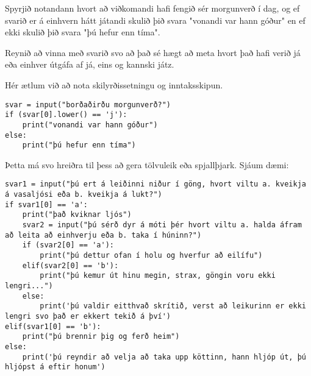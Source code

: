 \begin{exercise}\label{exp5}
Spyrjið notandann hvort að viðkomandi hafi fengið sér morgunverð í dag, og ef svarið er á einhvern hátt játandi skulið þið svara "vonandi var hann góður" en ef ekki skulið þið svara "þú hefur enn tíma".

Reynið að vinna með svarið svo að það sé hægt að meta hvort það hafi verið já eða einhver útgáfa af já, eins og kannski játz.
\end{exercise}
\begin{Answer}[ref={exp5}]
Hér ætlum við að nota skilyrðissetningu og inntaksskipun.
	\begin{lstlisting}
svar = input("borðaðirðu morgunverð?")
if (svar[0].lower() == 'j'):
	print("vonandi var hann góður")
else:
	print("þú hefur enn tíma")\end{lstlisting}

Þetta má svo hreiðra til þess að gera tölvuleik eða spjallþjark.
Sjáum dæmi:
\begin{lstlisting}
svar1 = input("þú ert á leiðinni niður í göng, hvort viltu a. kveikja á vasaljósi eða b. kveikja á lukt?")
if svar1[0] == 'a':
	print("það kviknar ljós")
	svar2 = input("þú sérð dyr á móti þér hvort viltu a. halda áfram að leita að einhverju eða b. taka í húninn?")
	if (svar2[0] == 'a'):
		print("þú dettur ofan í holu og hverfur að eilífu")
	elif(svar2[0] == 'b'):
		print("þú kemur út hinu megin, strax, göngin voru ekki lengri...")
	else:
		print('þú valdir eitthvað skrítið, verst að leikurinn er ekki lengri svo það er ekkert tekið á því')
elif(svar1[0] == 'b'):
	print("þú brennir þig og ferð heim")
else:
	print('þú reyndir að velja að taka upp köttinn, hann hljóp út, þú hljópst á eftir honum')\end{lstlisting}

\end{Answer}


